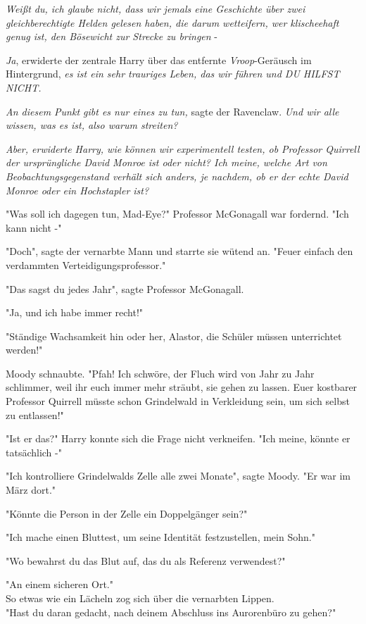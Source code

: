 {\emph{Weißt du, ich glaube nicht, dass wir jemals eine Geschichte über zwei gleichberechtigte Helden gelesen haben, die darum wetteifern, wer klischeehaft genug ist, den Bösewicht zur Strecke zu bringen} -

\emph{Ja}, erwiderte der zentrale Harry über das entfernte \emph{Vroop}-Geräusch im Hintergrund, \emph{es ist ein sehr trauriges Leben, das wir führen und DU HILFST NICHT.}

\emph{An diesem Punkt gibt es nur eines zu tun,} sagte der Ravenclaw. \emph{Und wir alle wissen, was es ist, also warum streiten?}

\emph{Aber, erwiderte Harry, wie können wir experimentell testen, ob Professor Quirrell der ursprüngliche David Monroe ist oder nicht? Ich meine, welche Art von Beobachtungsgegenstand verhält sich anders, je nachdem, ob er der echte David Monroe oder ein Hochstapler ist?}

"Was soll ich dagegen tun, Mad-Eye?" Professor McGonagall war fordernd. "Ich kann nicht -"

"Doch", sagte der vernarbte Mann und starrte sie wütend an. "Feuer einfach den verdammten Verteidigungsprofessor."

"Das sagst du jedes Jahr", sagte Professor McGonagall.

"Ja, und ich habe immer recht!"

"Ständige Wachsamkeit hin oder her, Alastor, die Schüler müssen unterrichtet werden!"

Moody schnaubte. "Pfah! Ich schwöre, der Fluch wird von Jahr zu Jahr schlimmer, weil ihr euch immer mehr sträubt, sie gehen zu lassen. Euer kostbarer Professor Quirrell müsste schon Grindelwald in Verkleidung sein, um sich selbst zu entlassen!"

"Ist er das?" Harry konnte sich die Frage nicht verkneifen. "Ich meine, könnte er tatsächlich -"

"Ich kontrolliere Grindelwalds Zelle alle zwei Monate", sagte Moody. "Er war im März dort."

"Könnte die Person in der Zelle ein Doppelgänger sein?"

"Ich mache einen Bluttest, um seine Identität festzustellen, mein Sohn."

"Wo bewahrst du das Blut auf, das du als Referenz verwendest?"

"An einem sicheren Ort."\\ So etwas wie ein Lächeln zog sich über die vernarbten Lippen.\\ "Hast du daran gedacht, nach deinem Abschluss ins Aurorenbüro zu gehen?"

}
